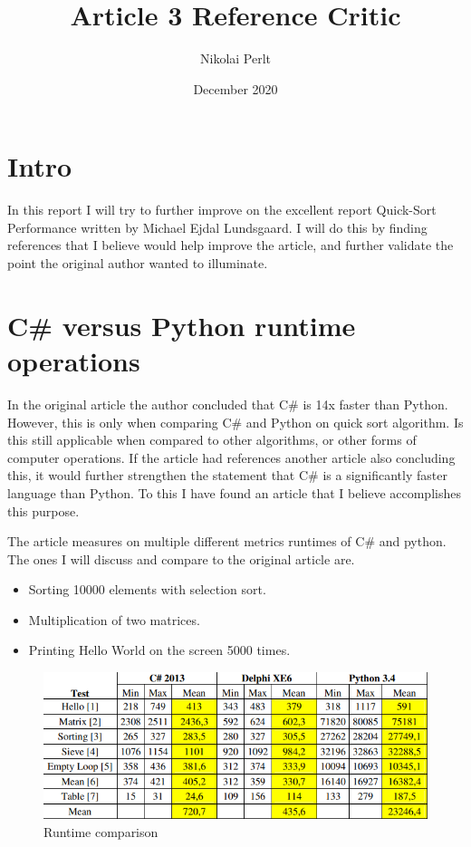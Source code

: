 \documentclass{article}
\title{Article 3 Reference Critic}
\author{Nikolai Perlt}
\date{December 2020}
\begin{document}
 \maketitle
\section*{Intro}
In this report I will try to further improve on the excellent report Quick-Sort Performance written by Michael Ejdal Lundsgaard\cite{pythonVsCSQuickSort}. I will do this by finding references that I believe would help improve the article, and further validate the point the original author wanted to illuminate. 
 
\section*{C\# versus Python runtime operations}
In the original article the author concluded that C\# is 14x faster than Python. However, this is only when comparing C\# and Python on quick sort algorithm. Is this still applicable when compared to other algorithms, or other forms of computer operations. If the article had references another article also concluding this, it would further strengthen the statement that C\# is a significantly faster language than Python. To this I have found an article that I believe accomplishes this purpose\cite{karaci2015performance}. 
 
The article measures on multiple different metrics runtimes of C\# and python. The ones I will discuss and compare to the original article are.
 
\begin{itemize}
 \item Sorting 10000 elements with selection sort.
 \item Multiplication of two matrices.
 \item Printing Hello World on the screen 5000 times. 
\end{itemize}
 
\begin{figure}
 \caption{Runtime comparison}
 \label{fig:runtimeTable}
 \includegraphics[width=\textwidth]{runtimeTable.png}
\end{figure}
 
\end{document}
